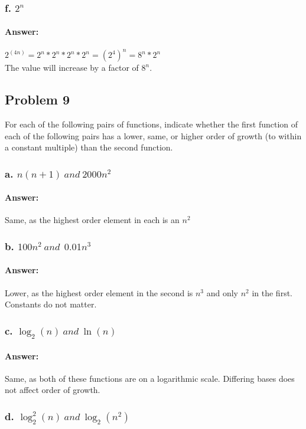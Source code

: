 \documentclass{article}
\begin{document}
    \subsubsection{f. $2^n$}
      \paragraph{Answer:}
        $2^(4n) = 2^n * 2^n * 2^n * 2^n = (2^4)^n = 8^n * 2^n$ \\
        The value will increase by a factor of $8^n$.
  \subsection{Problem 9}
        For each of the following pairs of functions, indicate whether the first function
        of each of the following pairs has a lower, same, or higher order of growth (to
        within a constant multiple) than the second function.
    \subsubsection{a. $n(n + 1) \ and \ 2000n^2$}
      \paragraph{Answer:}
        Same, as the highest order element in each is an $n^2$
    \subsubsection{b. $100n^2 \ and \ \ 0.01n^3$}
      \paragraph{Answer:}
        Lower, as the highest order element in the second is $n^3$ and only $n^2$ in the first. Constants do not matter.
    \subsubsection{c. $\log_{2}(n) \ and \ \ln(n)$}
      \paragraph{Answer:}
        Same, as both of these functions are on a logarithmic scale. Differing bases does not affect order of growth.
    \subsubsection{d. $\log_{2}^2(n) \ and \ \log_{2}(n^2)$}
\end{document}
